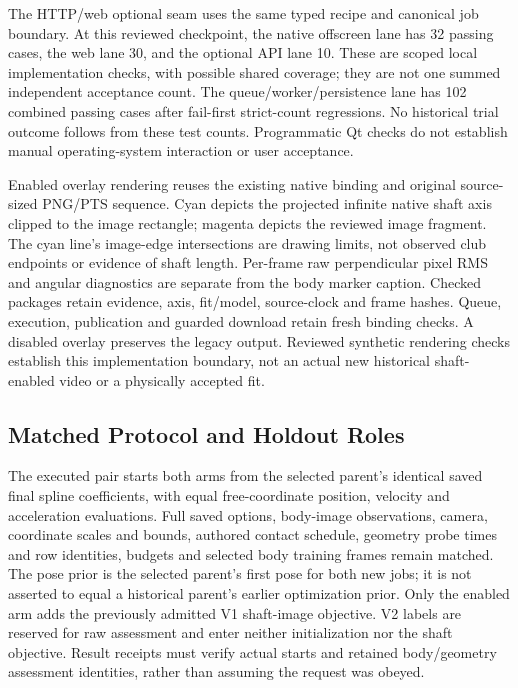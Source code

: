 \documentclass[11pt,letterpaper]{article}
\begin{document}
The HTTP/web optional seam uses the same typed recipe and canonical job
boundary. At this reviewed checkpoint, the native offscreen lane has 32 passing
cases, the web lane 30, and the optional API lane 10. These are scoped local
implementation checks, with possible shared coverage; they are not one summed
independent acceptance count. The queue/worker/persistence lane has 102 combined
passing cases after fail-first strict-count regressions. No historical trial
outcome follows from these test counts. Programmatic Qt checks do not establish
manual operating-system interaction or user acceptance.

Enabled overlay rendering reuses the existing native binding and original
source-sized PNG/PTS sequence. Cyan depicts the projected infinite native
shaft axis clipped to the image rectangle; magenta depicts the reviewed image
fragment. The cyan line's image-edge intersections are drawing limits, not
observed club endpoints or evidence of shaft length. Per-frame raw perpendicular
pixel RMS and angular diagnostics are separate from the body marker caption.
Checked packages retain evidence, axis, fit/model, source-clock and frame hashes.
Queue, execution, publication and guarded download retain fresh binding checks.
A disabled overlay preserves the legacy output. Reviewed synthetic rendering
checks establish this implementation boundary, not an actual new historical
shaft-enabled video or a physically accepted fit.

\subsection{Matched Protocol and Holdout Roles}
The executed pair starts both arms from the selected parent's identical saved
final spline coefficients, with equal free-coordinate position, velocity and
acceleration evaluations. Full saved options, body-image observations, camera,
coordinate scales and bounds, authored contact schedule, geometry probe times
and row identities, budgets and selected body training frames remain matched.
The pose prior is the selected parent's first pose for both new jobs; it is
not asserted to equal a historical parent's earlier optimization prior.
Only the enabled arm adds the previously admitted V1 shaft-image objective.
V2 labels are reserved for raw assessment and enter neither initialization nor
the shaft objective. Result receipts must verify actual starts and retained
body/geometry assessment identities, rather than assuming the request was obeyed.
\end{document}
